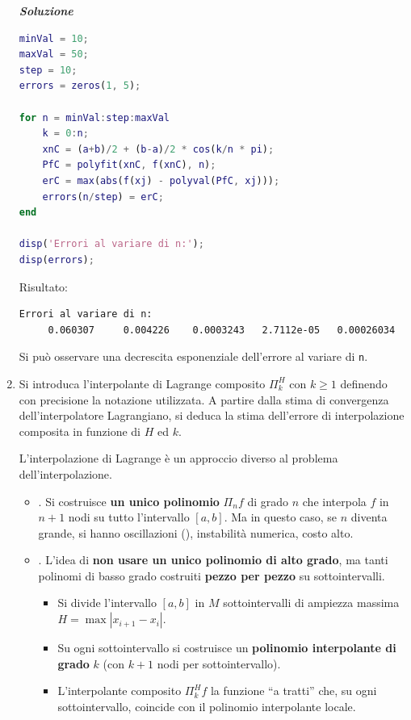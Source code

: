 \begin{enumerate}
    \textcolor{Green3}{\textbf{\emph{Soluzione}}}
    \begin{lstlisting}[language=MATLAB]
minVal = 10;
maxVal = 50;
step = 10;
errors = zeros(1, 5);

for n = minVal:step:maxVal
    k = 0:n;
    xnC = (a+b)/2 + (b-a)/2 * cos(k/n * pi);
    PfC = polyfit(xnC, f(xnC), n);
    erC = max(abs(f(xj) - polyval(PfC, xj)));
    errors(n/step) = erC;
end

disp('Errori al variare di n:');
disp(errors);\end{lstlisting}
    Risultato:
    \begin{lstlisting}
Errori al variare di n:
     0.060307     0.004226    0.0003243   2.7112e-05   0.00026034\end{lstlisting}
    Si può osservare una decrescita esponenziale dell'errore al variare di \texttt{n}.


    \item Si introduca l'interpolante di Lagrange composito $\Pi_{k}^{H}$ con $k \ge 1$ definendo con precisione la notazione utilizzata. A partire dalla stima di convergenza dell'interpolatore Lagrangiano, si deduca la stima dell'errore di interpolazione composita in funzione di $H$ ed $k$.
    
    \begin{remarkbox}
        L'interpolazione di Lagrange è un approccio diverso al problema dell'interpolazione.
        \begin{itemize}
            \item {}. Si costruisce \textbf{un unico polinomio} $\Pi_{n} f$ di grado $n$ che interpola $f$ in $n+1$ nodi su tutto l'intervallo $\left[a,b\right]$. Ma in questo caso, se $n$ diventa grande, si hanno oscillazioni (), instabilità numerica, costo alto.
            
            \item {}. L'idea \eaccent di \textbf{non usare un unico polinomio di alto grado}, ma tanti polinomi di basso grado costruiti \textbf{pezzo per pezzo} su sottointervalli.
            \begin{itemize}
                \item Si divide l'intervallo $\left[a,b\right]$ in $M$ sottointervalli di ampiezza massima $H = \max \left|x_{i + 1} - x_{i}\right|$.
                \item Su ogni sottointervallo si costruisce un \textbf{polinomio interpolante di grado} $k$ (con $k+1$ nodi per sottointervallo).
                \item L'interpolante composito $\Pi_{k}^{H}f$ \eaccent la funzione ``a tratti'' che, su ogni sottointervallo, coincide con il polinomio interpolante locale.
            \end{itemize}


\end{itemize}
\end{remarkbox}
\end{enumerate}
